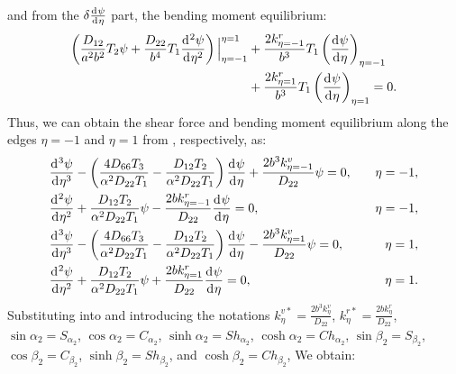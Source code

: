 \documentclass[preprint,12pt]{elsarticle}
\newcommand{\id}{\mathrm{d}\mkern1mu}
\begin{document}
%
and from the \( \delta \frac{\id \psi}{\id \eta} \) part, the bending moment equilibrium:
%
\begin{equation}\label{eq:inertial_forcey2}	
 \begin{split}
 	\left( \frac{D_{12}}{a^2b^2} T_2 \psi + \frac{D_{22}}{b^4} T_1 \frac{\id^2 \psi}{\id \eta^2} \right) 
 	\Big|^{\eta=1}_{\eta=-1} 
 	&+ \frac{2k^r_{\eta=-1}}{b^3} T_1 \left( \frac{\id \psi}{\id \eta} \right)_{\eta=-1} \\
 	&+ \frac{2k^r_{\eta=1}}{b^3} T_1 \left( \frac{\id \psi}{\id \eta} \right)_{\eta=1}=0.
 \end{split}
\end{equation}
%
Thus, we can obtain the shear force and bending moment equilibrium along the edges \( \eta = -1 \) and \( \eta = 1 \) from , respectively, as:
%
\begin{subequations}\label{eq:boundaryy}
	\begin{align}
		&  \frac{\id^3 \psi}{\id \eta^3}-\left( \frac{4D_{66}T_3}{\alpha^2D_{22}T_1}  - \frac{D_{12}T_2}{\alpha^2D_{22}T_1}  \right) \frac{\id \psi}{\id \eta} 
		+\frac{2b^3k^v_{\eta=-1}}{D_{22}}\psi=0,\quad &\eta=-1,\\
		& \frac{\id^2 \psi}{\id \eta^2}+\frac{D_{12}T_2}{\alpha^2D_{22}T_1} \psi -\frac{2bk^r_{\eta=-1}}{D_{22}}\frac{\id\psi }{\id \eta}=0,\quad &\eta=-1,\\
		&  \frac{\id^3 \psi}{\id \eta^3}-\left( \frac{4D_{66}T_3}{\alpha^2D_{22}T_1}  - \frac{D_{12}T_2}{\alpha^2D_{22}T_1}  \right) \frac{\id \psi}{\id \eta} 
		-\frac{2b^3k^v_{\eta=1}}{D_{22}}\psi=0,\quad &\eta=1,\\
		&\frac{\id^2 \psi}{\id \eta^2}+\frac{D_{12}T_2}{\alpha^2D_{22}T_1} \psi +\frac{2bk^r_{\eta=1}}{D_{22}}\frac{\id\psi }{\id \eta}=0,\quad &\eta=1.
	\end{align}
\end{subequations}
%
Substituting  into  and introducing the notations 
\( k^{v*}_{\eta} = \frac{2b^3 k^v_{\eta}}{D_{22}} \), 
\( k^{r*}_{\eta} = \frac{2b k^r_{\eta}}{D_{22}} \), 
\( \sin\alpha_2 = S_{\alpha_2} \), 
\( \cos\alpha_2 = C_{\alpha_2} \), 
\( \sinh\alpha_2 = Sh_{\alpha_2} \), 
\( \cosh\alpha_2 = Ch_{\alpha_2} \), 
\( \sin\beta_2 = S_{\beta_2} \), 
\( \cos\beta_2 = C_{\beta_2} \), 
\( \sinh\beta_2 = Sh_{\beta_2} \), and 
\( \cosh\beta_2 = Ch_{\beta_2} \), 
We obtain:
%
\end{document}
